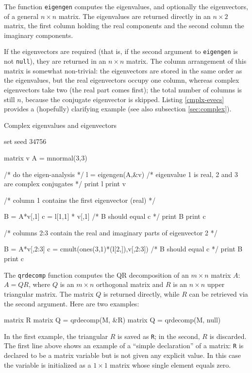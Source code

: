 The function \texttt{eigengen} computes the eigenvalues, and
optionally the eigenvectors, of a general $n \times n$ matrix.  The
eigenvalues are returned directly in an $n \times 2$ matrix, the first
column holding the real components and the second column the imaginary
components.  

If the eigenvectors are required (that is, if the second argument to
\texttt{eigengen} is not \texttt{null}), they are returned in an $n
\times n$ matrix. The column arrangement of this matrix is somewhat
non-trivial: the eigenvectors are stored in the same order as the
eigenvalues, but the real eigenvectors occupy one column, whereas
complex eigenvectors take two (the real part comes first); the total
number of columns is still $n$, because the conjugate eigenvector is
skipped. Listing \ref{cmplx-evecs} provides a (hopefully) clarifying
example (see also subsection \ref{sec:complex}).

\begin{script}[htbp]
  \caption{Complex eigenvalues and eigenvectors}
  \label{cmplx-evecs}
\begin{scode}
set seed 34756

matrix v
A = mnormal(3,3)

/* do the eigen-analysis */
l = eigengen(A,&v)
/* eigenvalue 1 is real, 2 and 3 are complex conjugates */
print l
print v

/* 
  column 1 contains the first eigenvector (real)
*/

B = A*v[,1]
c = l[1,1] * v[,1]
/* B should equal c */
print B
print c


/* 
  columns 2:3 contain the real and imaginary parts
  of eigenvector 2
*/

B = A*v[,2:3]
c = cmult(ones(3,1)*(l[2,]),v[,2:3])
/* B should equal c */
print B
print c
\end{scode}
\end{script}

The \texttt{qrdecomp} function computes the QR decomposition of an $m
\times n$ matrix $A$: $A = QR$, where $Q$ is an $m \times n$
orthogonal matrix and $R$ is an $n \times n$ upper triangular matrix.
The matrix $Q$ is returned directly, while $R$ can be retrieved via
the second argument.  Here are two examples:
%
\begin{code}
matrix R
matrix Q = qrdecomp(M, &R)
matrix Q = qrdecomp(M, null)
\end{code}
%
In the first example, the triangular $R$ is saved as \texttt{R}; in
the second, $R$ is discarded.  The first line above shows an example
of a ``simple declaration'' of a matrix: \texttt{R} is
declared to be a matrix variable but is not given any explicit value.
In this case the variable is initialized as a $1\times 1$ matrix whose
single element equals zero.

